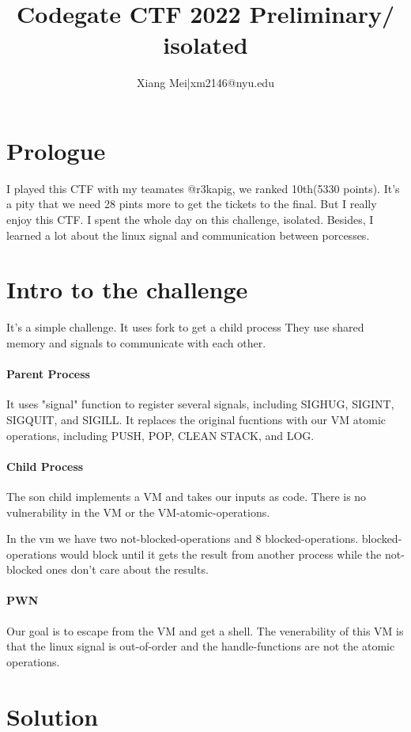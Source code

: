 \documentclass{article}
\author{Xiang Mei|xm2146@nyu.edu}
\title{Codegate CTF 2022 Preliminary/ isolated}
\begin{document}
\maketitle
\section{Prologue}

I played this CTF with my teamates @r3kapig, we ranked 10th(5330 points).
It's a pity that we need 28 pints more to get the tickets to the final. But
I really enjoy this CTF. I spent the whole day on this challenge, isolated.
Besides, I learned a lot about the linux signal and communication between porcesses.

\section{Intro to the challenge}
It's a simple challenge. It uses fork to get a child process
They use shared memory and signals to communicate with each 
other.

\paragraph{Parent Process}
It uses "signal" function to register several
signals, including SIGHUG, SIGINT, SIGQUIT, and SIGILL.
It replaces the original fucntions with our VM atomic 
operations, including PUSH, POP, CLEAN STACK, and LOG. 

\paragraph{Child Process}
The son child implements a VM and takes our inputs as code.
There is no vulnerability in the VM or the VM-atomic-operations.

In the vm we have two not-blocked-operations 
and 8 blocked-operations. blocked-operations would block 
until it gets the result from another process while 
the not-blocked ones don't care about the results.

\paragraph{PWN}
Our goal is to escape from the VM and get a shell. The 
venerability of this VM is that the linux signal is 
out-of-order and the handle-functions are not the 
atomic operations. 


\section{Solution}
\end{document}
